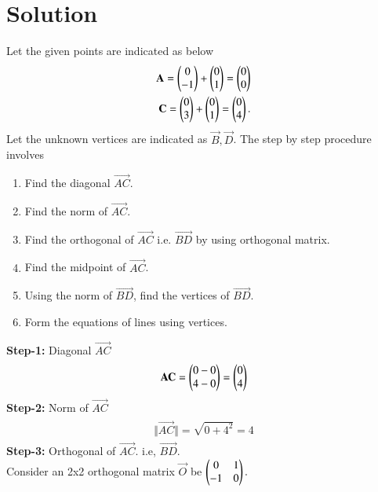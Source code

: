 \documentclass[journal,12pt,twocolumn]{IEEEtran}
\begin{document}
\section{Solution}
Let the given points are indicated as below\\
\begin{align}
\begin{split}
\mathbf{A} = \begin{pmatrix}0 \\ -1\end{pmatrix}  + \begin{pmatrix}0\\1\end{pmatrix} = \begin{pmatrix}0\\0\end{pmatrix}\\
\mathbf{C} = \begin{pmatrix}0 \\ 3\end{pmatrix} + \begin{pmatrix}0\\1\end{pmatrix} = \begin{pmatrix}0\\4\end{pmatrix}.\\
\end{split}
\end{align}
Let the unknown vertices are indicated as $ \vec{B},\vec{D}$. The step by step procedure involves
\begin{enumerate}
    \item Find the diagonal $\vec{AC}$.
    \item Find the norm of $\vec{AC}$.
    \item Find the orthogonal of $\vec{AC}$ i.e. $\vec{BD}$ by using orthogonal matrix.
    \item Find the midpoint of $\vec{AC}$.
    \item Using the norm of $\vec{BD}$, find the vertices of $\vec{BD}$.
    \item Form the equations of lines using vertices.
\end{enumerate}
\textbf{Step-1:} Diagonal $\vec{AC}$
\begin{align}
\begin{split}
\mathbf{AC} = \begin{pmatrix}0-0\\4-0\end{pmatrix} = \begin{pmatrix}0\\4\end{pmatrix}
\end{split}
\end{align}
\textbf{Step-2:} Norm of $\vec{AC}$
\begin{align}
\begin{split}
\Vert\vec{AC}\Vert = \sqrt{0+4^2} = 4
\end{split}
\end{align}
\textbf{Step-3:} Orthogonal of $\vec{AC}$. i.e, $\vec{BD}$.
\\
Consider an 2x2 orthogonal matrix $\vec{O}$ be $\begin{pmatrix}0&1\\-1&0\end{pmatrix}.$
\\
\end{document}
